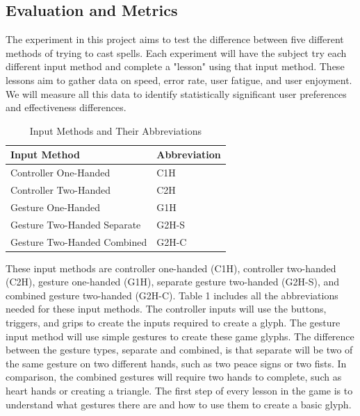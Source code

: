 \documentclass[acmlarge]{acmart}
\begin{document}
\subsection{Evaluation and Metrics}
The experiment in this project aims to test the difference between five different methods of trying to cast spells. Each experiment will have the subject try each different input method and complete a "lesson" using that input method. These lessons aim to gather data on speed, error rate, user fatigue, and user enjoyment. We will measure all this data to identify statistically significant user preferences and effectiveness differences.


\noindent
\begin{center}
\begin{table}[ht]
  \centering
  \caption{Input Methods and Their Abbreviations}
  \label{tab:input-abbr}
  \begin{tabular}{@{}ll@{}}
    \toprule
    \textbf{Input Method}                     & \textbf{Abbreviation} \\ 
    \midrule
    Controller One-Handed                     & C1H   \\
    Controller Two-Handed                     & C2H   \\
    Gesture One-Handed                        & G1H   \\
    Gesture Two-Handed Separate               & G2H-S \\
    Gesture Two-Handed Combined               & G2H-C \\
    \bottomrule
  \end{tabular}
\end{table}
\end{center}

These input methods are controller one-handed (C1H), controller two-handed (C2H), gesture one-handed (G1H), separate gesture two-handed (G2H-S), and combined gesture two-handed (G2H-C). Table 1 includes all the abbreviations needed for these input methods. The controller inputs will use the buttons, triggers, and grips to create the inputs required to create a glyph. The gesture input method will use simple gestures to create these game glyphs. The difference between the gesture types, separate and combined, is that separate will be two of the same gesture on two different hands, such as two peace signs or two fists. In comparison, the combined gestures will require two hands to complete, such as heart hands or creating a triangle. The first step of every lesson in the game is to understand what gestures there are and how to use them to create a basic glyph.
\end{document}
